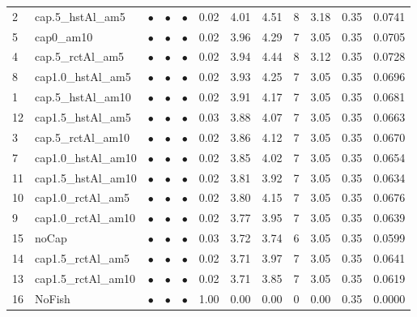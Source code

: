 \documentclass[11pt]{book}
\begin{document}
\begin{turn}
\begin{longtable}[t]{llcccccccccc}
2 & cap.5\_hstAl\_am5 & $\bullet$ & $\bullet$ & $\bullet$ & 0.02 & 4.01 & 4.51 & 8 & 3.18 & 0.35 & 0.0741\\
5 & cap0\_am10 & $\bullet$ & $\bullet$ & $\bullet$ & 0.02 & 3.96 & 4.29 & 7 & 3.05 & 0.35 & 0.0705\\
4 & cap.5\_rctAl\_am5 & $\bullet$ & $\bullet$ & $\bullet$ & 0.02 & 3.94 & 4.44 & 8 & 3.12 & 0.35 & 0.0728\\
8 & cap1.0\_hstAl\_am5 & $\bullet$ & $\bullet$ & $\bullet$ & 0.02 & 3.93 & 4.25 & 7 & 3.05 & 0.35 & 0.0696\\
1 & cap.5\_hstAl\_am10 & $\bullet$ & $\bullet$ & $\bullet$ & 0.02 & 3.91 & 4.17 & 7 & 3.05 & 0.35 & 0.0681\\
12 & cap1.5\_hstAl\_am5 & $\bullet$ & $\bullet$ & $\bullet$ & 0.03 & 3.88 & 4.07 & 7 & 3.05 & 0.35 & 0.0663\\
3 & cap.5\_rctAl\_am10 & $\bullet$ & $\bullet$ & $\bullet$ & 0.02 & 3.86 & 4.12 & 7 & 3.05 & 0.35 & 0.0670\\
7 & cap1.0\_hstAl\_am10 & $\bullet$ & $\bullet$ & $\bullet$ & 0.02 & 3.85 & 4.02 & 7 & 3.05 & 0.35 & 0.0654\\
11 & cap1.5\_hstAl\_am10 & $\bullet$ & $\bullet$ & $\bullet$ & 0.02 & 3.81 & 3.92 & 7 & 3.05 & 0.35 & 0.0634\\
10 & cap1.0\_rctAl\_am5 & $\bullet$ & $\bullet$ & $\bullet$ & 0.02 & 3.80 & 4.15 & 7 & 3.05 & 0.35 & 0.0676\\
9 & cap1.0\_rctAl\_am10 & $\bullet$ & $\bullet$ & $\bullet$ & 0.02 & 3.77 & 3.95 & 7 & 3.05 & 0.35 & 0.0639\\
15 & noCap & $\bullet$ & $\bullet$ & $\bullet$ & 0.03 & 3.72 & 3.74 & 6 & 3.05 & 0.35 & 0.0599\\
14 & cap1.5\_rctAl\_am5 & $\bullet$ & $\bullet$ & $\bullet$ & 0.02 & 3.71 & 3.97 & 7 & 3.05 & 0.35 & 0.0641\\
13 & cap1.5\_rctAl\_am10 & $\bullet$ & $\bullet$ & $\bullet$ & 0.02 & 3.71 & 3.85 & 7 & 3.05 & 0.35 & 0.0619\\
16 & NoFish & $\bullet$ & $\bullet$ & $\bullet$ & 1.00 & 0.00 & 0.00 & 0 & 0.00 & 0.35 & 0.0000\\
\bottomrule
\end{longtable}
\endgroup{}
\endgroup{}
\end{turn}
\newpage
\end{document}
